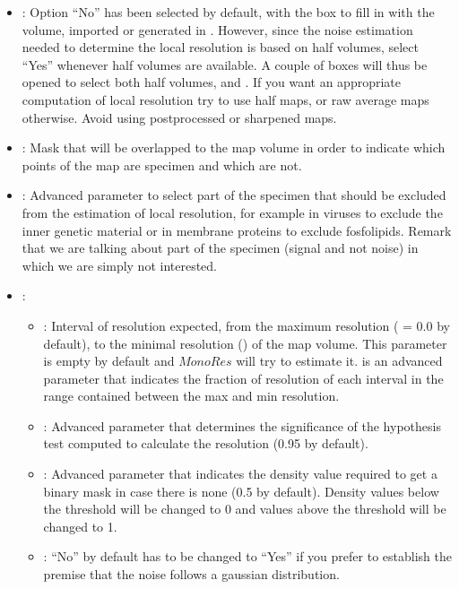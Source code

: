 \begin{itemize}
    \begin{itemize}
        \item {}: Option ``No'' has been selected by default, with the box  to fill in with the volume, imported or generated in \scipion. However, since the noise estimation needed to determine the local resolution is based on half volumes, select ``Yes'' whenever half volumes are available. A couple of boxes will thus be opened to select both half volumes,  and . If you want an appropriate computation of local resolution try to use half maps, or raw average maps otherwise. Avoid using postprocessed or sharpened maps. 
        \item {}: Mask that will be overlapped to the map volume in order to indicate which points of the map are specimen and which are not.
         \item {}: Advanced parameter to select part of the specimen that should be excluded from the estimation of local resolution, for example in viruses to exclude the inner genetic material or in membrane proteins to exclude fosfolipids. Remark that we are talking about part of the specimen (signal and not noise) in which we are simply not interested. 
        \item {}:
        \begin{itemize}
            \item {}: Interval of resolution expected, from the maximum resolution ( = 0.0 by default), to the minimal resolution () of the map volume. This parameter is empty by default and $MonoRes$ will try to estimate it.  is an advanced parameter that indicates the fraction of resolution of each interval in the range contained between the max and min resolution. 
            \item {}: Advanced parameter that determines the significance of the hypothesis test computed to calculate the resolution (0.95 by default).
            \item {}: Advanced parameter that indicates the density value required to get a binary mask in case there is none (0.5 by default). Density values below the threshold will be changed to 0 and values above the threshold will be changed to 1.
            \item {}: ``No'' by default has to be changed to ``Yes'' if you prefer to establish the premise that the noise follows a gaussian distribution. 

\end{itemize}
\end{itemize}
\end{itemize}
